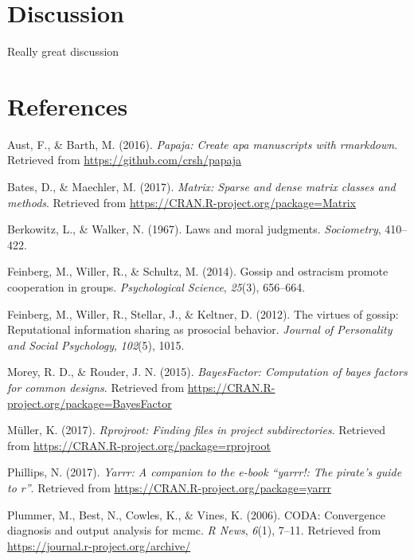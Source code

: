 \documentclass[english,man]{apa6}
\theoremstyle{definition}
\theoremstyle{definition}
\theoremstyle{remark}
\begin{document}
\section{Discussion}\label{discussion}

Really great discussion

\newpage

\section{References}\label{references}

\setlength{\parindent}{-0.5in} \setlength{\leftskip}{0.5in}

\hypertarget{refs}{}
\hypertarget{ref-R-papaja}{}
Aust, F., \& Barth, M. (2016). \emph{Papaja: Create apa manuscripts with
rmarkdown}. Retrieved from \url{https://github.com/crsh/papaja}

\hypertarget{ref-R-Matrix}{}
Bates, D., \& Maechler, M. (2017). \emph{Matrix: Sparse and dense matrix
classes and methods}. Retrieved from
\url{https://CRAN.R-project.org/package=Matrix}

\hypertarget{ref-berkowitz1967laws}{}
Berkowitz, L., \& Walker, N. (1967). Laws and moral judgments.
\emph{Sociometry}, 410--422.

\hypertarget{ref-feinberg2014gossip}{}
Feinberg, M., Willer, R., \& Schultz, M. (2014). Gossip and ostracism
promote cooperation in groups. \emph{Psychological Science},
\emph{25}(3), 656--664.

\hypertarget{ref-feinberg2012virtues}{}
Feinberg, M., Willer, R., Stellar, J., \& Keltner, D. (2012). The
virtues of gossip: Reputational information sharing as prosocial
behavior. \emph{Journal of Personality and Social Psychology},
\emph{102}(5), 1015.

\hypertarget{ref-R-BayesFactor}{}
Morey, R. D., \& Rouder, J. N. (2015). \emph{BayesFactor: Computation of
bayes factors for common designs}. Retrieved from
\url{https://CRAN.R-project.org/package=BayesFactor}

\hypertarget{ref-R-rprojroot}{}
Müller, K. (2017). \emph{Rprojroot: Finding files in project
subdirectories}. Retrieved from
\url{https://CRAN.R-project.org/package=rprojroot}

\hypertarget{ref-R-yarrr}{}
Phillips, N. (2017). \emph{Yarrr: A companion to the e-book ``yarrr!:
The pirate's guide to r''}. Retrieved from
\url{https://CRAN.R-project.org/package=yarrr}

\hypertarget{ref-R-coda}{}
Plummer, M., Best, N., Cowles, K., \& Vines, K. (2006). CODA:
Convergence diagnosis and output analysis for mcmc. \emph{R News},
\emph{6}(1), 7--11. Retrieved from
\url{https://journal.r-project.org/archive/}
\end{document}
